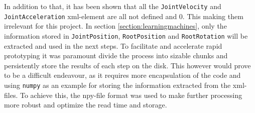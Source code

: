 In addition to that, it has been shown that all the \texttt{JointVelocity} and \texttt{JointAcceleration} xml-element are all not defined and 0. This making them irrelevant for this project. In section \ref{section:learningmachines}, only the information stored in \texttt{JointPosition}, \texttt{RootPosition} and \texttt{RootRotation} will be extracted and used in the next steps. To facilitate and accelerate rapid prototyping it was paramount divide the process into sizable chunks and persistently store the results of each step on the disk. This however would prove to be a difficult endeavour, as it requires more encapsulation of the code and using \texttt{numpy} as an example for storing the information extracted from the xml-files. To achieve this, the npy-file format was used to make further processing more robust and optimize the read time and storage.
